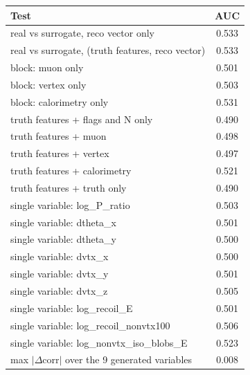 \begin{tabular}{lc}
\toprule
Test & AUC \\
\midrule
real vs surrogate, reco vector only & 0.533 \\
real vs surrogate, (truth features, reco vector) & 0.533 \\
\midrule
block: muon only & 0.501 \\
block: vertex only & 0.503 \\
block: calorimetry only & 0.531 \\
truth features + flags and N only & 0.490 \\
truth features + muon & 0.498 \\
truth features + vertex & 0.497 \\
truth features + calorimetry & 0.521 \\
truth features + truth only & 0.490 \\
single variable: log\_P\_ratio & 0.503 \\
single variable: dtheta\_x & 0.501 \\
single variable: dtheta\_y & 0.500 \\
single variable: dvtx\_x & 0.500 \\
single variable: dvtx\_y & 0.501 \\
single variable: dvtx\_z & 0.505 \\
single variable: log\_recoil\_E & 0.501 \\
single variable: log\_recoil\_nonvtx100 & 0.506 \\
single variable: log\_nonvtx\_iso\_blobs\_E & 0.523 \\
\midrule
max $|\Delta$corr$|$ over the 9 generated variables & 0.008 \\
\bottomrule
\end{tabular}
